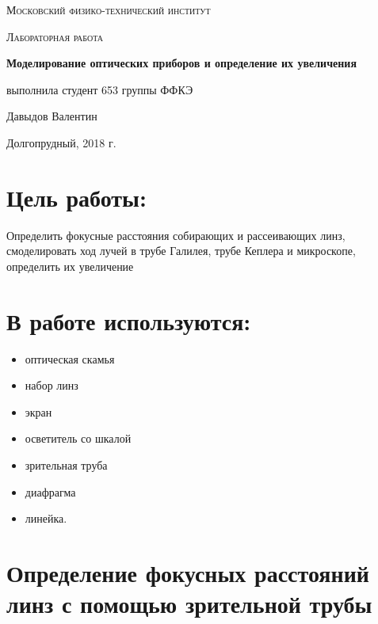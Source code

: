 \documentclass[a4paper]{article}
\begin{document}
\begin{titlepage}
	\centering
	\vspace{5cm}
	{\scshape\LARGE Московский физико-технический институт \par}
	\vspace{4cm}
	{\scshape\Large Лабораторная работа \par}
	\vspace{1cm}
	{\huge\bfseries Моделирование оптических приборов и определение их увеличения \par}
	\vspace{1cm}
	\vfill
\begin{flushright}
	{\large выполнила студент 653 группы ФФКЭ}\par
	\vspace{0.3cm}
	{\LARGE Давыдов Валентин} \par

\end{flushright}
	

	\vfill

	Долгопрудный, 2018 г.
\end{titlepage}


\section{Цель работы:}
Определить фокусные расстояния собирающих и рассеивающих линз, смоделировать ход лучей в трубе Галилея, трубе Кеплера и микроскопе, определить их увеличение

\section{В работе используются:}
\begin{itemize}
    \item оптическая скамья
    \item набор линз
    \item экран
    \item осветитель со шкалой
    \item зрительная труба
    \item диафрагма
    \item линейка.
\end{itemize}

\section{Определение фокусных расстояний линз с помощью зрительной трубы}
\end{document}
